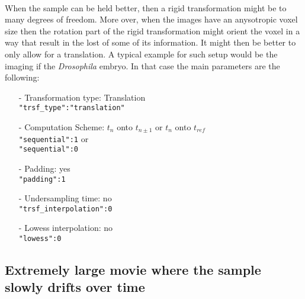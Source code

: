 \documentclass[10pt,a4paper]{book}
\begin{document}
\paragraph{}When the sample can be held better, then a rigid transformation might be to many degrees of freedom. More over, when the images have an anysotropic voxel size then the rotation part of the rigid transformation might orient the voxel in a way that result in the lost of some of its information. It might then be better to only allow for a translation. A typical example for such setup would be the imaging if the \textit{Drosophila} embryo. In that case the main parameters are the following:
	\begin{itemize}
		\item[-] Transformation type: Translation\\
					\texttt{"trsf\_type":"translation"}
		\item[-] Computation Scheme: $t_n$ onto $t_{n\pm 1}$ or $t_n$ onto $t_{ref}$\\
					\texttt{"sequential":1}
					or\\
					\texttt{"sequential":0}
		\item[-] Padding: yes\\
					\texttt{"padding":1}
		\item[-] Undersampling time: no\\
					\texttt{"trsf\_interpolation":0}
		\item[-] Lowess interpolation: no\\
					\texttt{"lowess":0}
	\end{itemize}
\subsection{Extremely large movie where the sample slowly drifts over time}
\end{document}
